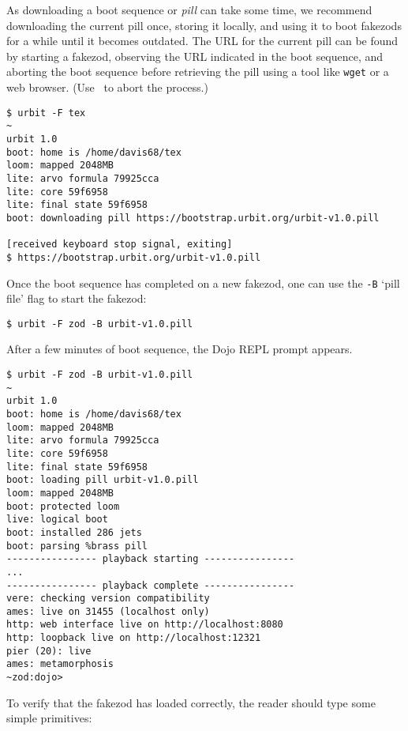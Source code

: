 {{{{As downloading a boot sequence or \emph{pill} can take some time, we recommend downloading the current pill once, storing it locally, and using it to boot fakezods for a while until it becomes outdated.  The URL for the current pill can be found by starting a fakezod, observing the URL indicated in the boot sequence, and aborting the boot sequence before retrieving the pill using a tool like \texttt{wget} or a web browser.  (Use \CtrlZ~to abort the process.)

\begin{lstlisting}[style=nonumbers]
$ urbit -F tex
~
urbit 1.0
boot: home is /home/davis68/tex
loom: mapped 2048MB
lite: arvo formula 79925cca
lite: core 59f6958
lite: final state 59f6958
boot: downloading pill https://bootstrap.urbit.org/urbit-v1.0.pill

[received keyboard stop signal, exiting]
$ https://bootstrap.urbit.org/urbit-v1.0.pill
\end{lstlisting}

Once the boot sequence has completed on a new fakezod, one can use the \texttt{-B} ‘pill file’ flag to start the fakezod:

\begin{lstlisting}[style=nonumbers]
$ urbit -F zod -B urbit-v1.0.pill
\end{lstlisting}

After a few minutes of boot sequence, the Dojo REPL prompt appears.

\begin{lstlisting}[style=nonumbers]
$ urbit -F zod -B urbit-v1.0.pill
~
urbit 1.0
boot: home is /home/davis68/tex
loom: mapped 2048MB
lite: arvo formula 79925cca
lite: core 59f6958
lite: final state 59f6958
boot: loading pill urbit-v1.0.pill
loom: mapped 2048MB
boot: protected loom
live: logical boot
boot: installed 286 jets
boot: parsing %brass pill
---------------- playback starting ----------------
...
---------------- playback complete ----------------
vere: checking version compatibility
ames: live on 31455 (localhost only)
http: web interface live on http://localhost:8080
http: loopback live on http://localhost:12321
pier (20): live
ames: metamorphosis
~zod:dojo>
\end{lstlisting}

To verify that the fakezod has loaded correctly, the reader should type some simple primitives:

}}}}

